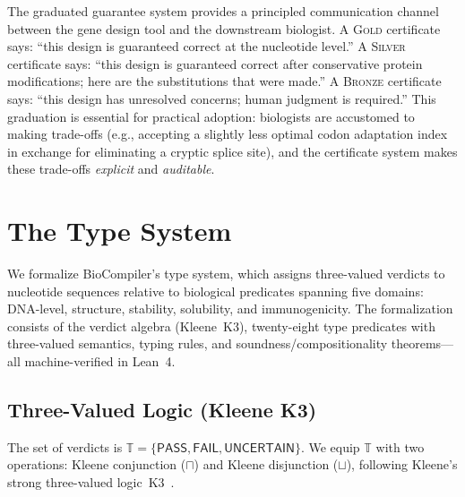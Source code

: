 \documentclass[acmsmall,review,anonymous]{acmart}
\newcommand{\PASS}{\ensuremath{\mathsf{PASS}}\xspace}
\newcommand{\FAIL}{\ensuremath{\mathsf{FAIL}}\xspace}
\newcommand{\UNCERTAIN}{\ensuremath{\mathsf{UNCERTAIN}}\xspace}
\newcommand{\tvl}{\mathbb{T}}
\newcommand{\GOLD}{\textsc{Gold}\xspace}
\newcommand{\SILVER}{\textsc{Silver}\xspace}
\newcommand{\BRONZE}{\textsc{Bronze}\xspace}
\begin{document}
The graduated guarantee system provides a principled communication
channel between the gene design tool and the downstream
biologist.
A \GOLD{} certificate says: ``this design is guaranteed correct at the
nucleotide level.''
A \SILVER{} certificate says: ``this design is guaranteed correct
after conservative protein modifications; here are the substitutions
that were made.''
A \BRONZE{} certificate says: ``this design has unresolved concerns;
human judgment is required.''
This graduation is essential for practical adoption: biologists are
accustomed to making trade-offs (e.g., accepting a slightly less
optimal codon adaptation index in exchange for eliminating a cryptic
splice site), and the certificate system makes these trade-offs
\emph{explicit} and \emph{auditable}.

\section{The Type System}\label{sec:typesys}

We formalize BioCompiler's type system, which assigns three-valued
verdicts to nucleotide sequences relative to biological predicates
spanning five domains: DNA-level, structure, stability, solubility,
and immunogenicity.
The formalization consists of the verdict algebra (Kleene~K3),
twenty-eight type predicates with three-valued semantics, typing
rules, and soundness/compositionality theorems---all machine-verified
in Lean~4.

\subsection{Three-Valued Logic (Kleene K3)}\label{sec:3vl}

The set of verdicts is $\tvl = \{\PASS, \FAIL, \UNCERTAIN\}$.
We equip $\tvl$ with two operations: Kleene conjunction ($\sqcap$) and
Kleene disjunction ($\sqcup$), following Kleene's strong three-valued
logic~K3~\cite{kleene1952introduction}.
\end{document}

